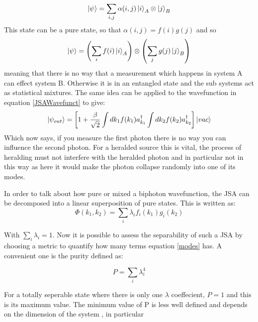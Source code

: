 \begin{equation}
\ket{\psi} = \sum_{i,j}\alpha(i,j)\ket{i}_A\otimes\ket{j}_B 
\end{equation}
\noindent
This state can be a pure state, so that $\alpha(i,j)=f(i)g(j)$ and so
\begin{equation}
\ket{\psi} = \left (\sum_{i}f(i)\ket{i}_A \right ) \otimes \left (\sum_{j}g(j)\ket{j}_B \right )
\end{equation}
meaning that there is no way that a measurement which happens in system A can effect system B. Otherwise it is in an entangled state and the sub systems act as statistical mixtures. The same idea can be applied to the wavefunction in equation \ref{JSAWavefunct} to give:
\begin{equation}
\ket{\psi_{out}}=\left [1 + \frac{\beta}{\sqrt{2}}\int dk_1f(k_1)a_{k_1}^{\dagger} \int dk_2f(k_2)a_{k_2}^{\dagger} \right ]\ket{vac}
\end{equation}
Which now says, if you measure the first photon there is no way you can influence the second photon. For a heralded source this is vital, the process of heralding must not interfere with the heralded photon and in particular not in this way as here it would make the photon collapse randomly into one of its modes.




In order to talk about how pure or mixed a biphoton wavefunction, the JSA can be decomposed into a linear superposition of pure states. This is written as\cite{harder_optimized_2013}:
\begin{equation} \label{modes}
	\Phi(k_1,k_2) = \sum_i \lambda_if_i(k_1)g_i(k_2)
\end{equation}

With $\sum_i \lambda_i=1$. Now it is possible to assess the separability of such a JSA by choosing a metric to quantify how many terms  equation \ref{modes} has. A convenient one is the purity defined as: 

\begin{equation} \label{purityEqn}
	P = \sum_i \lambda_i^4
\end{equation}

For a totally seperable state where there is only one $\lambda$ coeffecient, $P=1$ and this is its maximum value. The minimum value of P is less well defined and depends on the dimension of the system , in particular 




